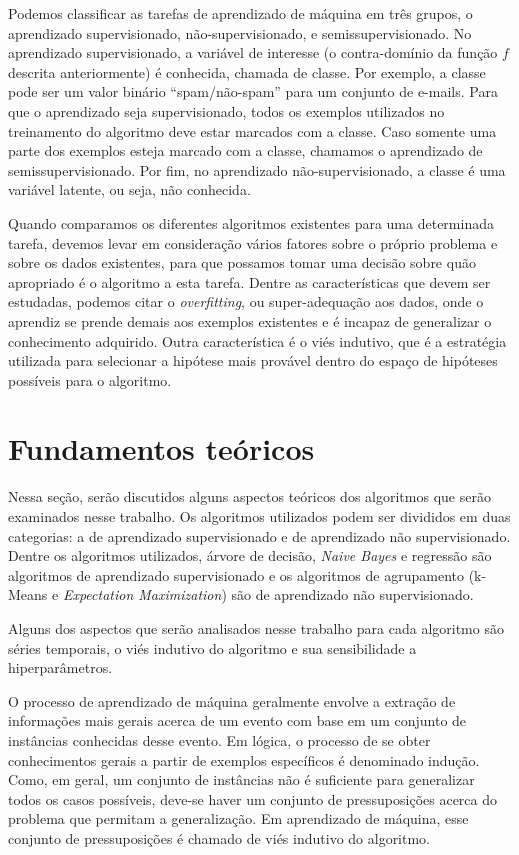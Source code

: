 \documentclass{article}
\begin{document}
Podemos classificar as tarefas de aprendizado de máquina em três grupos,
o aprendizado supervisionado, não-supervisionado, e semissupervisionado.
No aprendizado supervisionado, a variável de interesse (o contra-domínio da função $f$ descrita anteriormente)
é conhecida, chamada de classe. Por exemplo, a classe pode ser um valor binário ``spam/não-spam''
para um conjunto de e-mails. Para que o aprendizado seja supervisionado, todos os exemplos utilizados
no treinamento do algoritmo deve estar marcados com a classe.
Caso somente uma parte dos exemplos esteja marcado com a classe, chamamos o aprendizado de semissupervisionado.
Por fim, no aprendizado não-supervisionado, a classe é uma variável latente, ou seja, não conhecida.

Quando comparamos os diferentes algoritmos existentes para uma determinada tarefa,
devemos levar em consideração vários fatores sobre o próprio problema e sobre os dados existentes,
para que possamos tomar uma decisão sobre quão apropriado é o algoritmo a esta tarefa.
Dentre as características que devem ser estudadas,
podemos citar o {\it overfitting}, ou super-adequação aos dados,
onde o aprendiz se prende demais aos exemplos existentes e é incapaz de generalizar o conhecimento adquirido.
Outra característica é o viés indutivo, que é a estratégia utilizada para selecionar a
hipótese mais provável dentro do espaço de hipóteses possíveis para o algoritmo.

\section{Fundamentos teóricos}

Nessa seção, serão discutidos alguns aspectos teóricos dos algoritmos que serão examinados nesse trabalho.
Os algoritmos utilizados podem ser divididos em duas categorias: a de aprendizado supervisionado e de aprendizado não supervisionado.
Dentre os algoritmos utilizados, árvore de decisão, {\it Naive Bayes} e regressão são algoritmos de aprendizado supervisionado e os algoritmos de agrupamento (k-Means e {\it Expectation Maximization}) são de aprendizado não supervisionado.

Alguns dos aspectos que serão analisados nesse trabalho para cada algoritmo são séries temporais, o viés indutivo do algoritmo e sua sensibilidade a hiperparâmetros.

O processo de aprendizado de máquina geralmente envolve a extração de informações mais gerais acerca de um evento com base em um conjunto de instâncias conhecidas desse evento.
Em lógica, o processo de se obter conhecimentos gerais a partir de exemplos específicos é denominado indução.
Como, em geral, um conjunto de instâncias não é suficiente para generalizar todos os casos possíveis,
deve-se haver um conjunto de pressuposições acerca do problema que permitam a generalização.
Em aprendizado de máquina, esse conjunto de pressuposições é chamado de viés indutivo do algoritmo.
\end{document}
